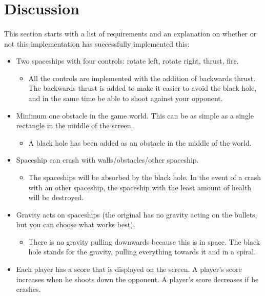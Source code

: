 \documentclass{article}
\begin{document}
 



\section{Discussion}
\paragraph{}
This section starts with a list of requirements and an explanation on whether or not this implementation has successfully implemented this:
\begin{itemize}
	\item Two spaceships with four controls: rotate left, rotate right, thrust, fire.
	\begin{itemize}
		\item All the controls are implemented with the addition of backwards thrust. The backwards thrust is added to make it easier to avoid the black hole, and in the same time be able to shoot against your opponent.
	\end{itemize}
	\item Minimum one obstacle in the game world. This can be as simple as a single rectangle in the middle of the screen.
	\begin{itemize}
		\item A black hole has been added as an obstacle in the middle of the world.
	\end{itemize}
	\item Spaceship can crash with walls/obstacles/other spaceship.
	\begin{itemize}
		\item The spaceships will be absorbed by the black hole. In the event of a crash with an other spaceship, the spaceship with the least amount of health will be destroyed.
	\end{itemize}
	\item Gravity acts on spaceships (the original has no gravity acting on the
	bullets, but you can choose what works best).
	\begin{itemize}
		\item There is no gravity pulling downwards because this is in space. The black hole stands for the gravity, pulling everything towards it and in a spiral.
	\end{itemize}
	\item Each player has a score that is displayed on the screen. A player's score increases when he shoots down the opponent. A player's score decreases if he crashes.

\end{itemize}
\end{document}
